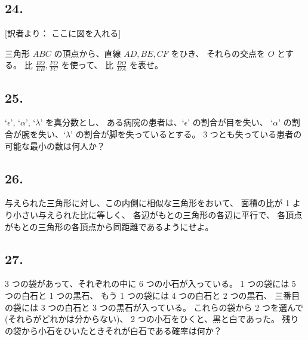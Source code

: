 \subsection*{24.}

[訳者より： ここに図を入れる]

三角形 $ABC$ の頂点から、直線 $AD, BE, CF$ をひき、
それらの交点を $O$ とする。
比 $\frac{EO}{EB}, \frac{FO}{FC}$ を使って、
比 $\frac{DO}{DA}$ を表せ。

\begin{flushright}
[5/86]
\end{flushright}

\subsection*{25.}

`$\epsilon$', `$\alpha$', `$\lambda$' を真分数とし、
ある病院の患者は、`$\epsilon$' の割合が目を失い、
`$\alpha$' の割合が腕を失い、`$\lambda$' の割合が脚を失っているとする。
 3 つとも失っている患者の可能な最小の数は何人か？

\begin{flushright}
[7/2/76]
\end{flushright}

\subsection*{26.}

与えられた三角形に対し、この内側に相似な三角形をおいて、
面積の比が 1 より小さい与えられた比に等しく、
各辺がもとの三角形の各辺に平行で、
各頂点がもとの三角形の各頂点から同距離であるようにせよ。

\begin{flushright}
[4/89]
\end{flushright}

\subsection*{27.}

 3 つの袋があって、それぞれの中に 6 つの小石が入っている。
 1 つの袋には 5 つの白石と 1 つの黒石、
もう 1 つの袋には 4 つの白石と 2 つの黒石、
三番目の袋には 3 つの白石と 3 つの黒石が入っている。
これらの袋から 2 つを選んで(それらがどれかは分からない)、
 2 つの小石をひくと、黒と白であった。
残りの袋から小石をひいたときそれが白石である確率は何か？

\begin{flushright}
[4/3/80]
\end{flushright}

